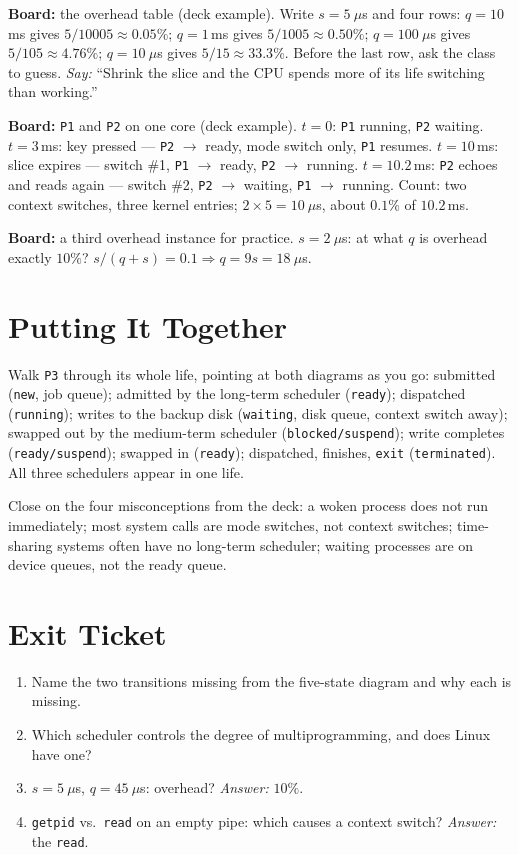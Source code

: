 \documentclass[11pt]{article}
\begin{document}
\textbf{Board:} the overhead table (deck example). Write $s = 5\ \mu$s and four rows: $q = 10$\,ms gives $5/10005 \approx 0.05\%$; $q = 1$\,ms gives $5/1005 \approx 0.50\%$; $q = 100\ \mu$s gives $5/105 \approx 4.76\%$; $q = 10\ \mu$s gives $5/15 \approx 33.3\%$. Before the last row, ask the class to guess. \emph{Say:} ``Shrink the slice and the CPU spends more of its life switching than working.''

\textbf{Board:} \texttt{P1} and \texttt{P2} on one core (deck example). $t=0$: \texttt{P1} running, \texttt{P2} waiting. $t=3$\,ms: key pressed --- \texttt{P2} $\to$ ready, mode switch only, \texttt{P1} resumes. $t=10$\,ms: slice expires --- switch \#1, \texttt{P1} $\to$ ready, \texttt{P2} $\to$ running. $t=10.2$\,ms: \texttt{P2} echoes and reads again --- switch \#2, \texttt{P2} $\to$ waiting, \texttt{P1} $\to$ running. Count: two context switches, three kernel entries; $2 \times 5 = 10\ \mu$s, about $0.1\%$ of $10.2$\,ms.

\textbf{Board:} a third overhead instance for practice. $s = 2\ \mu$s: at what $q$ is overhead exactly $10\%$? $s/(q+s) = 0.1 \Rightarrow q = 9s = 18\ \mu$s.

\section{Putting It Together}

Walk \texttt{P3} through its whole life, pointing at both diagrams as you go: submitted (\texttt{new}, job queue); admitted by the long-term scheduler (\texttt{ready}); dispatched (\texttt{running}); writes to the backup disk (\texttt{waiting}, disk queue, context switch away); swapped out by the medium-term scheduler (\texttt{blocked/suspend}); write completes (\texttt{ready/suspend}); swapped in (\texttt{ready}); dispatched, finishes, \texttt{exit} (\texttt{terminated}). All three schedulers appear in one life.

Close on the four misconceptions from the deck: a woken process does not run immediately; most system calls are mode switches, not context switches; time-sharing systems often have no long-term scheduler; waiting processes are on device queues, not the ready queue.

\section{Exit Ticket}

\begin{enumerate}
  \item Name the two transitions missing from the five-state diagram and why each is missing.
  \item Which scheduler controls the degree of multiprogramming, and does Linux have one?
  \item $s = 5\ \mu$s, $q = 45\ \mu$s: overhead? \emph{Answer:} $10\%$.
  \item \texttt{getpid} vs.\ \texttt{read} on an empty pipe: which causes a context switch? \emph{Answer:} the \texttt{read}.
\end{enumerate}
\end{document}
